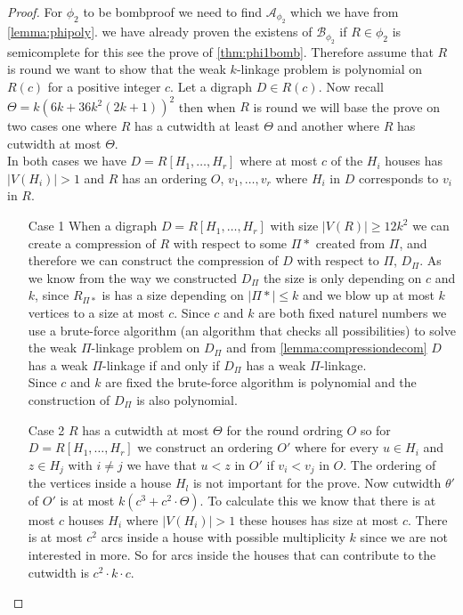 \begin{proof}
    For $\phi_2$ to be bombproof we need to find $\mathcal{A}_{\phi_2}$ which we have from \autoref{lemma:phipoly}.
    we have already proven the existens of $\mathcal{B}_{\phi_2}$ if $R\in\phi_2$ is semicomplete for this see the prove of \autoref{thm:phi1bomb}.
    Therefore assume that $R$ is round we  want to show that the weak $k$-linkage problem is polynomial on $R(c)$ for a positive integer $c$.
    Let a digraph $D\in R(c)$. Now recall $\Theta = k(6k+36k^2(2k+1))^2$ then when $R$ is round we will base the prove on two cases one where $R$ has a cutwidth at least $\Theta$ and another where $R$ has cutwidth at most $\Theta$.\\
    In both cases we have $D=R[H_1,\dots ,H_r]$ where at most $c$ of the $H_i$ houses has $|V(H_i)|>1$ and $R$ has an ordering $O$, $v_1,\dots ,v_r$ where $H_i$ in $D$ corresponds to $v_i$ in $R$.
    \begin{itemize}
        \item[Case 1] When a digraph $D=R[H_1,\dots ,H_r]$ with size $|V(R)|\geq 12k^2$ we can create a compression of $R$ with respect to some $\Pi*$ created from $\Pi$, and therefore we can construct the compression of $D$ with respect to $\Pi$, $D_{\Pi}$.
        As we know from the way we constructed $D_\Pi$ the size is only depending on $c$ and $k$, since $R_{\Pi*}$ is has a size depending on $|\Pi*|\leq k$ and we blow up at most $k$ vertices to a size at most $c$. 
        Since $c$ and $k$ are both fixed naturel numbers we use a brute-force algorithm (an algorithm that checks all possibilities) to solve the weak $\Pi$-linkage problem on $D_\Pi$ and from \autoref{lemma:compressiondecom} $D$ has a weak $\Pi$-linkage if and only if $D_\Pi$ has a weak $\Pi$-linkage.\\
        Since $c$ and $k$ are fixed the brute-force algorithm is polynomial and the construction of $D_\Pi$ is also polynomial.
        \item[Case 2] $R$ has a cutwidth at most $\Theta$ for the round ordring $O$ so for $D=R[H_1,\dots ,H_r]$ we construct an ordering $O'$ where for every $u\in H_i$ and $z\in H_j$ with $i\neq j$ we have that $u < z$ in $O'$ if $v_i < v_j$ in $O$.
        The ordering of the vertices inside a house $H_l$ is not important for the prove.
        Now cutwidth $\theta'$ of $O'$ is at most $k(c^3+c^2\cdot \Theta)$.
        To calculate this we know that there is at most $c$ houses $H_i$ where $|V(H_i)|>1$ these houses has size at most $c$. 
        There is at most $c^2$ arcs inside a house with possible multiplicity $k$ since we are not interested in more. So for arcs inside the houses that can contribute to the cutwidth is $c^2\cdot k\cdot c$.

\end{itemize}
\end{proof}
